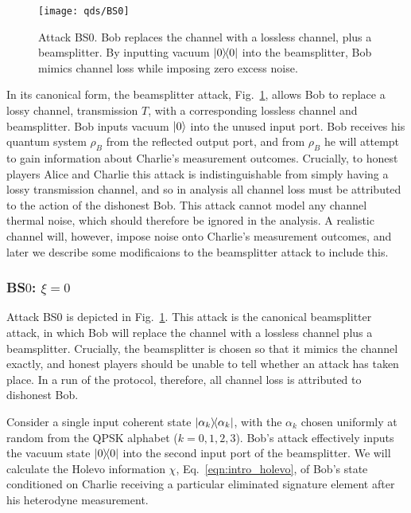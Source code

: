 \begin{figure}[htp]
\captionsetup{width=0.8\linewidth}
\centering
\texttt{[image: qds/BS0]}
\caption{\label{fig:bs0_attack} Attack BS$0$. Bob replaces the channel with a lossless channel, plus a beamsplitter. By inputting vacuum $\dyad{0}$ into the beamsplitter, Bob mimics channel loss while imposing zero excess noise.}
\end{figure}

In its canonical form, the beamsplitter attack, Fig.~\ref{fig:bs0_attack}, allows Bob to replace a lossy channel, transmission $T$, with a corresponding lossless channel and beamsplitter. Bob inputs vacuum $\ket{0}$ into the unused input port. Bob receives his quantum system $\rho_B$ from the reflected output port, and from $\rho_B$ he will attempt to gain information about Charlie's measurement outcomes. Crucially, to honest players Alice and Charlie this attack is indistinguishable from simply having a lossy transmission channel, and so in analysis all channel loss must be attributed to the action of the dishonest Bob.  This attack cannot model any channel thermal noise, which should therefore be ignored in the analysis. A realistic channel will, however, impose noise onto Charlie's measurement outcomes, and later we describe some modificaions to the beamsplitter attack to include this.


\subsubsection{BS$0$: $\xi = 0$}\label{sec:qds_bs0}
Attack BS$0$ is depicted in Fig.~\ref{fig:bs0_attack}. This attack is the canonical beamsplitter attack, in which Bob will replace the channel with a lossless channel plus a beamsplitter. Crucially, the beamsplitter is chosen so that it mimics the channel exactly, and honest players should be unable to tell whether an attack has taken place. In a run of the protocol, therefore, all channel loss is attributed to dishonest Bob.


Consider a single input coherent state $\dyad{\alpha_k}$, with the $\alpha_k$ chosen uniformly at random from the QPSK alphabet ($k = 0,1,2,3$). Bob's attack effectively inputs the vacuum state $\dyad{0}$ into the second input port of the beamsplitter. We will calculate the Holevo information $\chi$, Eq.~\ref{eqn:intro_holevo}, of Bob's state conditioned on Charlie receiving a particular eliminated signature element after his heterodyne measurement.

